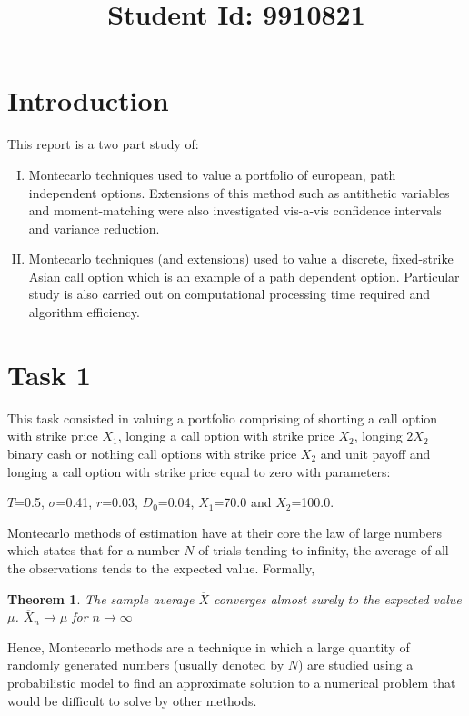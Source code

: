 \documentclass{article}
\newtheorem{theorem}{Theorem}
\begin{document}
\title{Student Id: 9910821}
\date{}

\maketitle
\section*{Introduction}
This report is a two part study of:
\begin{enumerate}[I)]
  \item Montecarlo techniques used to value a portfolio of european, path independent options.
  Extensions of this method such as antithetic variables and moment-matching were also investigated vis-a-vis confidence intervals and variance reduction.
  \item Montecarlo techniques (and extensions) used to value a discrete, fixed-strike Asian call option
  which is an example of a path dependent option. Particular study is also carried out on computational processing time required and
  algorithm efficiency.
\end{enumerate}

\section*{Task 1}
This task consisted in valuing a portfolio comprising of shorting a call option with strike price $X_1$,
 longing a call option with strike price $X_2$, longing $2 X_2$ binary cash or nothing call options with strike
 price $X_2$ and unit payoff and longing a call option with strike price equal to zero with parameters:

\begin{flushleft}
$T$=0.5, $\sigma$=0.41, $r$=0.03, $D_0$=0.04, $X_1$=70.0 and $X_2$=100.0.
\end{flushleft}
Montecarlo methods of estimation have at their core the law of large numbers which states that for a number $N$ of
trials tending to infinity, the average of all the observations tends to the expected value. Formally,
\begin{theorem}
The sample average $\overline{X}$ converges almost surely to the expected value $\mu$.
$\overline{X}_n \to \mu$ for $ n \to \infty$
\label{thrm:LLN}
\end{theorem}
Hence, Montecarlo methods are a technique in which a large quantity of randomly generated numbers (usually denoted by $N$) are
studied using a probabilistic model to find an approximate solution to a
numerical problem that would be difficult to solve by other methods.
\\
\end{document}
